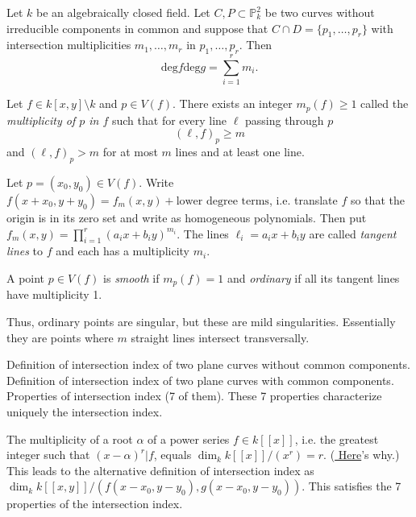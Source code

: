 \begin{theorem}[Bézout]
\label{theorem-bezout}
Let $k$ be an algebraically closed field.
Let  $C,P \subset \mathbb{P}_k^2$ be two
curves without
irreducible components in common
and suppose that $C \cap D= \{p_1,…,p_r\}$
with intersection multiplicities  $m_1,…,m_r$
in $p_1,…,p_r$.
Then
$$
\text{deg}f\text{deg}g=\sum_{i=1}^r m_i.
$$
\end{theorem}


\begin{proposition}
\label{proposition-multiplicity-point}
Let $f \in k[x,y]\setminus k$ and $p \in
V(f)$.
There exists an integer $m_p(f)\geq 1$ called
the {\it multiplicity of $p$ in $f$}
such that for every line $\ell$ passing
through  $p$
 $$
(\ell,f)_p \geq m
$$
and $(\ell,f)_p>m$ for at most $m$ lines and
at least one line.
\end{proposition}

\begin{definition}
\label{definition-tangent-line}
Let $p=(x_0,y_0) \in V(f)$.
Write $f(x+x_0,y+y_0)=f_m(x,y)+\text{lower
degree terms} $,
i.e. translate $f$ so that the origin is in
its zero set
and write as homogeneous polynomials.
Then put
$f_m(x,y)=\prod_{i=1}^r(a_ix+b_iy)^{m_i}$.
The lines $\ell_i=a_ix+b_iy$ are called
{\it tangent lines} to $f$ and each has a
multiplicity $m_i$.
\end{definition}

\begin{definition}
\label{definition-smoot-ordin-point-curve}
A point $p \in V(f)$ is {\it smooth} if
$m_p(f)=1$
and  {\it ordinary} if all its tangent lines
have multiplicity 1.
\end{definition}

\noindent
Thus, ordinary points are singular,
but these are mild singularities.
Essentially they are points where $m$
straight lines intersect transversally.

Definition of intersection index of two plane
curves
without common components.
Definition of intersection index of two plane
curves
with common components.
Properties of intersection index (7 of them).
These 7 properties characterize uniquely the
intersection index.

The multiplicity of a root $\alpha$ of a
power series
$f\in k[[x]]$,
i.e. the greatest integer such that
$(x-\alpha)^r|f$,
equals $\dim_k k[[x]]/(x^r)=r$.
(\href{https://www.youtube.com/live/%
EspNBiSU8F4?si=UEcdxrysAS47ZA9H&t=5230}{
Here}'s why.)
This leads to the alternative definition
of intersection index as
$\dim_k
k[[x,y]]/(f(x-x_0,y-y_0),g(x-x_0,y-y_0))$.
This satisfies the 7 properties of the
intersection index.


